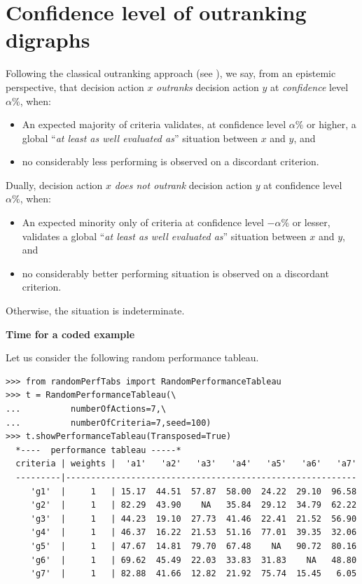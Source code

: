 \section{Confidence level of outranking digraphs}
\label{sec:18.3}

\begin{definition}\label{def:18.1}

\noindent Following the classical outranking approach (see \citep{BIS-2013}), we say, from an epistemic perspective, that decision action $x$ \emph{outranks} decision action $y$ at \emph{confidence} level $\alpha\%$, when:
\begin{itemize}[topsep=1pt]
\item An expected majority of criteria validates, at confidence level $\alpha\%$ or higher, a global ``\emph{at least as well evaluated as}'' situation between $x$ and $y$, and
\item no considerably less performing is observed on a discordant criterion.
\end{itemize}
Dually, decision action $x$ \emph{does not outrank} decision action $y$ at confidence level $\alpha\%$, when:
\begin{itemize}[topsep=0pt]
\item An expected minority only of criteria at confidence level $-\alpha\%$ or lesser, validates a global ``\emph{at least as well evaluated as}'' situation between $x$ and $y$, and
\item no considerably better performing situation is observed on a discordant criterion.
\end{itemize}
Otherwise, the situation is indeterminate.
\end{definition}

\noindent \textbf{Time for a coded example}

\noindent Let us consider the following random performance tableau.
\begin{lstlisting}[label=list:18.1,basicstyle=\ttfamily\scriptsize]
>>> from randomPerfTabs import RandomPerformanceTableau
>>> t = RandomPerformanceTableau(\
...          numberOfActions=7,\
...          numberOfCriteria=7,seed=100)
>>> t.showPerformanceTableau(Transposed=True)
  *----  performance tableau -----*
  criteria | weights |  'a1'   'a2'   'a3'   'a4'   'a5'   'a6'   'a7'   
  ---------|----------------------------------------------------------
     'g1'  |     1   | 15.17  44.51  57.87  58.00  24.22  29.10  96.58  
     'g2'  |     1   | 82.29  43.90    NA   35.84  29.12  34.79  62.22  
     'g3'  |     1   | 44.23  19.10  27.73  41.46  22.41  21.52  56.90  
     'g4'  |     1   | 46.37  16.22  21.53  51.16  77.01  39.35  32.06  
     'g5'  |     1   | 47.67  14.81  79.70  67.48    NA   90.72  80.16  
     'g6'  |     1   | 69.62  45.49  22.03  33.83  31.83    NA   48.80  
     'g7'  |     1   | 82.88  41.66  12.82  21.92  75.74  15.45   6.05  
\end{lstlisting}

